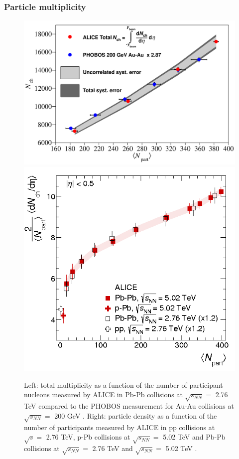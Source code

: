 \documentclass[b5paper,10pt,twoside,oldstyle,classica]{toptesi}
\begin{document}
\subsubsection{Particle multiplicity}
\begin{figure}[tb]
\begin{center}
{\includegraphics[scale = 0.21]{totmult_vs_Npart.png}}
\hspace{0cm}
{\includegraphics[scale = 0.26]{mult_vs_Npart.png}}
\caption{Left: total multiplicity as a function of the number of participant nucleons measured by ALICE in Pb-Pb collisions at $\sqrt{s_{NN}} = $ 2.76 TeV compared to the PHOBOS measurement for Au-Au collisions at $\sqrt{s_{NN}} = $ 200 GeV \cite{Abbas:2013bpa}. Right: particle density as a function of the number of participants measured by ALICE in pp collisions at $\sqrt{s} = $ 2.76 TeV, p-Pb collisions at $\sqrt{s_{NN}} = $ 5.02 TeV and Pb-Pb collisions at $\sqrt{s_{NN}} = $ 2.76 TeV and $\sqrt{s_{NN}} = $ 5.02 TeV \cite{Adam:2015ptt}.}
\label{MultVsNpart}
\end{center}
\end{figure}
\end{document}
